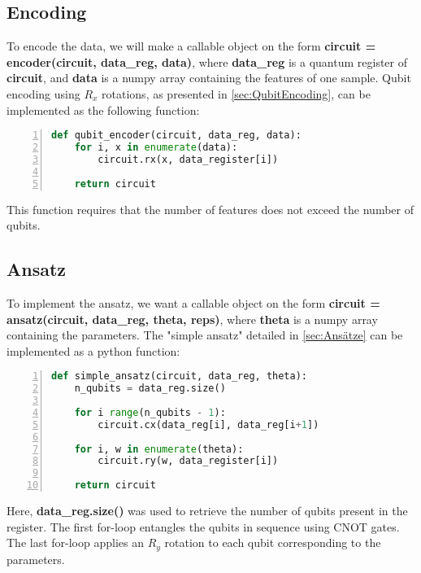 \subsection{Encoding}

To encode the data, we will make a callable object on the form \textbf{circuit = encoder(circuit, data\_reg, data)}, where \textbf{data\_reg} is a quantum register of \textbf{circuit}, and \textbf{data} is a numpy array containing the features of one sample. Qubit encoding using $R_x$ rotations, as presented in \autoref{sec:QubitEncoding}, can be implemented as the following function:

\begin{lstlisting}[language=python, numbers=left]
def qubit_encoder(circuit, data_reg, data):
    for i, x in enumerate(data):
        circuit.rx(x, data_register[i])
        
    return circuit
\end{lstlisting}

This function requires that the number of features does not exceed the number of qubits.

\subsection{Ansatz}
To implement the ansatz, we want a callable object on the form 
\textbf{circuit = ansatz(circuit, data\_reg, theta, reps)}, where \textbf{theta} is a numpy array containing the parameters. The "simple ansatz" detailed in \autoref{sec:Ansätze} can be implemented as a python function:

\begin{lstlisting}[language=python, numbers=left]
def simple_ansatz(circuit, data_reg, theta):
    n_qubits = data_reg.size()
    
    for i range(n_qubits - 1):
        circuit.cx(data_reg[i], data_reg[i+1])
    
    for i, w in enumerate(theta):
        circuit.ry(w, data_register[i])
        
    return circuit
\end{lstlisting}
Here, \textbf{data\_reg.size()} was used to retrieve the number of qubits present in the register. The first for-loop entangles the qubits in sequence using CNOT gates. The last for-loop applies an $R_y$ rotation to each qubit corresponding to the parameters.

